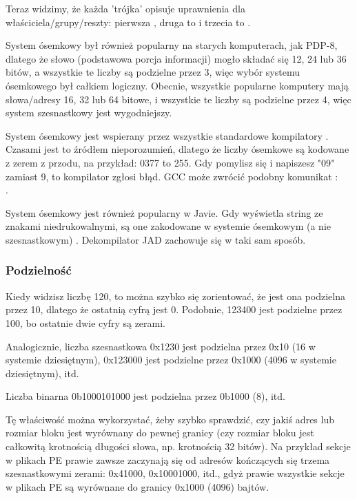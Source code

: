 Teraz widzimy, że każda 'trójka' opisuje uprawnienia dla właściciela/grupy/reszty: pierwsza , druga to  i trzecia to .

System ósemkowy był również popularny na starych komputerach, jak PDP-8, dlatego że słowo (podstawowa porcja informacji) mogło składać się 12, 24 lub
36 bitów, a wszystkie te liczby są podzielne przez 3, więc wybór systemu ósemkowego był całkiem logiczny.
Obecnie, wszystkie popularne komputery mają słowa/adresy 16, 32 lub 64 bitowe, i wszystkie te liczby są podzielne przez 4,
więc system szesnastkowy jest wygodniejszy.

System ósemkowy jest wspierany przez wszystkie standardowe kompilatory \CCpp{}.
Czasami jest to źródłem nieporozumień, dlatego że liczby ósemkowe są kodowane z zerem z przodu, na przykład: 0377 to 255.
Gdy pomylisz się i napiszesz "09" zamiast 9, to kompilator zgłosi błąd.
GCC może zwrócić podobny komunikat :\\
.

System ósemkowy jest również popularny w Javie. Gdy \IDA wyświetla string ze znakami niedrukowalnymi, są one zakodowane w systemie ósemkowym (a nie szesnastkowym)
.
Dekompilator JAD zachowuje się w taki sam sposób.

\subsubsection{Podzielność}

Kiedy widzisz liczbę 120, to można szybko się zorientować, że jest ona podzielna przez 10, dlatego że ostatnią cyfrą jest 0.
Podobnie, 123400 jest podzielne przez 100, bo ostatnie dwie cyfry są zerami.

Analogicznie, liczba szesnastkowa 0x1230 jest podzielna przez 0x10 (16 w systemie dziesiętnym), 0x123000 jest podzielne przez 0x1000 (4096 w systemie dziesiętnym), itd.

Liczba binarna 0b1000101000 jest podzielna przez 0b1000 (8), itd.

Tę właściwość można wykorzystać, żeby szybko sprawdzić,
czy jakiś adres lub rozmiar bloku jest wyrównany do pewnej granicy (czy rozmiar bloku jest całkowitą krotnością długości słowa, np. krotnością 32 bitów).
Na przykład sekcje w plikach \ac{PE} prawie zawsze zaczynają się od adresów kończących się trzema szesnastkowymi zerami: 0x41000, 0x10001000, itd., gdyż prawie wszystkie sekcje w plikach \ac{PE} są wyrównane do granicy 0x1000 (4096) bajtów.


